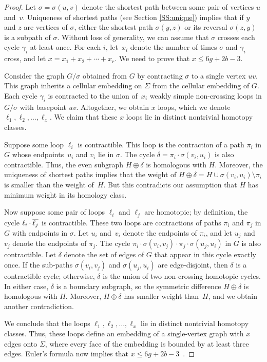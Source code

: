 \documentclass[11pt,twoside]{article}
\def\reverse#1{\smash{\overline{#1}}}
\begin{document}
\begin{proof}
Let $\sigma = \sigma(u,v)$ denote the shortest path between some pair of vertices $u$ and~$v$.  Uniqueness of shortest paths (see Section \ref{SS:unique}) implies that if $y$ and $z$ are vertices of $\sigma$, either the shortest path $\sigma(y,z)$ or its reversal $\sigma(z,y)$ is a subpath of $\sigma$.  Without loss of generality, we can assume that $\sigma$ crosses each cycle $\gamma_i$ at least once.  For each $i$, let~$x_i$ denote the number of times $\sigma$ and $\gamma_i$ cross, and let $x = x_1 + x_2 + \cdots + x_r$.  We need to prove that $x\le 6g+2b-3$.

Consider the graph $G/\sigma$ obtained from $G$ by contracting $\sigma$ to a single vertex $uv$.  This graph inherits a cellular embedding on $\Sigma$ from the cellular embedding of $G$.  Each cycle $\gamma_i$ is contracted to the union of~$x_i$ weakly simple non-crossing loops in $G/\sigma$ with basepoint $uv$.  Altogether, we obtain $x$ loops, which we denote $\ell_1, \ell_2, \dots, \ell_x$.  We claim that these $x$ loops lie in distinct nontrivial homotopy classes.

Suppose some loop $\ell_i$ is contractible.  This loop is the contraction of a path $\pi_i$ in $G$ whose endpoints~$u_i$ and $v_i$ lie in $\sigma$.  The cycle $\delta = \pi_i \cdot \sigma(v_i,u_i)$ is also contractible.  Thus, the even subgraph $H\oplus\delta$ is homologous with $H$.  Moreover, the uniqueness of shortest paths implies that the weight of $H\oplus\delta = H \cup \sigma(v_i,u_i) \setminus \pi_i$ is smaller than the weight of~$H$.  But this contradicts our assumption that $H $ has minimum weight in its homology class.

Now suppose some pair of loops $\ell_i$ and $\ell_j$ are homotopic; by definition, the cycle $\ell_i\cdot\reverse{\ell_j}$ is contractible.  These two loops are contractions of paths $\pi_i$ and $\pi_j$ in $G$ with endpoints in $\sigma$.  Let $u_i$ and~$v_i$ denote the endpoints of $\pi_i$, and let $u_j$ and~$v_j$ denote the endpoints of $\pi_j$.  The cycle $\pi_i \cdot \sigma(v_i,v_j) \cdot \overline{\pi_j} \cdot \sigma(u_j, u_i)$ in $G$ is also contractible.  Let $\delta$ denote the set of edges of $G$ that appear in this cycle exactly once.  If the sub-paths $\sigma(v_i,v_j)$ and $\sigma(u_j, u_i)$ are edge-disjoint, then $\delta$ is a contractible cycle; otherwise, $\delta$ is the union of two non-crossing homotopic cycles.  In either case, $\delta$ is a boundary subgraph, so the symmetric difference $H\oplus\delta$ is homologous with $H$.  Moreover, $H\oplus\delta$ has smaller weight than~$H$, and we obtain another contradiction.

We conclude that the loops $\ell_1, \ell_2, \dots, \ell_x$ lie in distinct nontrivial homotopy classes.  Thus, these loops define an embedding of a single-vertex graph with $x$ edges onto $\Sigma$, where every face of the embedding is bounded by at least three edges.  Euler's formula now implies that $x\le 6g+2b-3$~\cite[Lemma~2.1]{ccelw-scsih-08}.
\end{proof}
\end{document}
